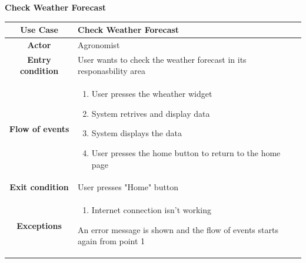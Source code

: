 \documentclass[table, 12pt]{article}
\begin{document}
\begin{itemize}
            \begin{table}[H]
                \item[] \textbf{Check Weather Forecast}
                \item[] 
                \centering
                \begin{tabular}{|c |m{}|}
                    \hline
                    \textbf{Use Case} & Check Weather Forecast\\ \hline
                    \textbf{Actor} & Agronomist\\ \hline
                    \textbf{Entry condition} & User wants to check the weather forecast in its responasbility area \\  \hline
                    \textbf{Flow of events} & \begin{enumerate}
                                                \item User presses the wheather widget
                                                \item System retrives and display data 
                                                \item System displays the data
                                                \item User presses the home button to return to the home page
                                            \end{enumerate}\\ \hline
                    \textbf{Exit condition} & User presses "Home" button\\ \hline
                    \textbf{Exceptions} &\begin{enumerate}
                        \item Internet connection isn't working
                    \end{enumerate}
                    An error message is shown and the flow of events starts again from point 1 \\ \hline                    
                \end{tabular}
            \end{table}


\end{itemize}
\end{document}
